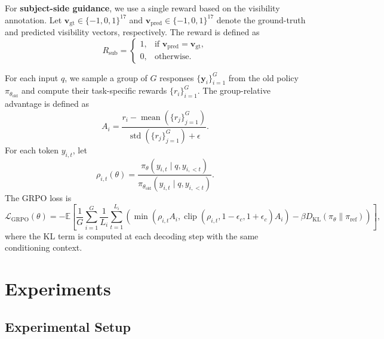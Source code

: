 \documentclass{llmxive}
\begin{document}
For \textbf{subject-side guidance}, we use a single reward based on the visibility annotation. Let $\mathbf{v}_{\text{gt}} \in \{-1,0,1\}^{17}$ and $\mathbf{v}_{\text{pred}} \in \{-1,0,1\}^{17}$ denote the ground-truth and predicted visibility vectors, respectively. The reward is defined as
\begin{equation}
R_{\text{sub}} =
\begin{cases}
1, & \text{if } \mathbf{v}_{\text{pred}} = \mathbf{v}_{\text{gt}}, \\
0, & \text{otherwise}.
\end{cases}
\end{equation}

For each input $q$, we sample a group of $G$ responses
$\{\mathbf{y}_i\}_{i=1}^{G}$ from the old policy $\pi_{\theta_{\mathrm{old}}}$ and compute their
task-specific rewards $\{r_i\}_{i=1}^{G}$. The group-relative advantage is defined as
\begin{equation}
A_i =
\frac{r_i-\operatorname{mean}(\{r_j\}_{j=1}^{G})}
{\operatorname{std}(\{r_j\}_{j=1}^{G})+\epsilon}.
\end{equation}
For each token $y_{i,t}$, let
\begin{equation}
\rho_{i,t}(\theta)
=
\frac{
\pi_{\theta}(y_{i,t}\mid q,y_{i,<t})
}{
\pi_{\theta_{\mathrm{old}}}(y_{i,t}\mid q,y_{i,<t})
}.
\end{equation}
The GRPO loss is
\begin{equation}
\mathcal{L}_{\mathrm{GRPO}}(\theta)
=
-
\mathbb{E}
\left[
\frac{1}{G}
\sum_{i=1}^{G}
\frac{1}{L_i}
\sum_{t=1}^{L_i}
\left(
\min
\left(
\rho_{i,t} A_i,
\operatorname{clip}(\rho_{i,t},1-\epsilon_c,1+\epsilon_c) A_i
\right)
-
\beta
D_{\mathrm{KL}}
\left(
\pi_{\theta}
\|
\pi_{\mathrm{ref}}
\right)
\right)
\right],
\end{equation}
where the KL term is computed at each decoding step with the same conditioning context.

\section{Experiments}
\label{sec:experiments}
\subsection{Experimental Setup}
\end{document}
